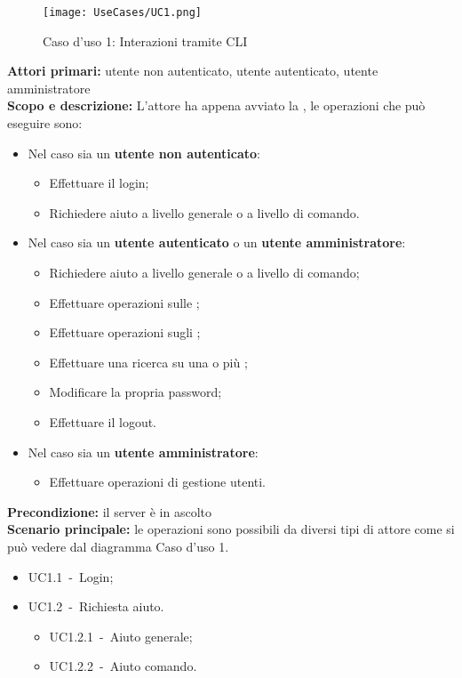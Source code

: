 \documentclass{scalatekids-article}
\begin{document}
\begin{figure}[H]
  \begin{center}
    \texttt{[image: UseCases/UC1.png]}
    \caption{Caso d'uso 1: Interazioni tramite CLI}
  \end{center}
\end{figure}
\textbf{Attori primari:} utente non autenticato, utente autenticato, utente amministratore\\
\textbf{Scopo e descrizione:} L'attore ha appena avviato la , le operazioni che può eseguire sono:
\begin{itemize}
\item Nel caso sia un \textbf{utente non autenticato}:
  \begin{itemize}
  \item Effettuare il login;
  \item Richiedere aiuto a livello generale o a livello di comando.
  \end{itemize}
\item Nel caso sia un \textbf{utente autenticato} o un \textbf{utente amministratore}:
  \begin{itemize}
  \item Richiedere aiuto a livello generale o a livello di comando;
  \item Effettuare operazioni sulle ;
  \item Effettuare operazioni sugli ;
  \item Effettuare una ricerca su una o più ;
  \item Modificare la propria password;
  \item Effettuare il logout.
  \end{itemize}
\item Nel caso sia un \textbf{utente amministratore}:
  \begin{itemize}
  \item Effettuare operazioni di gestione utenti.
  \end{itemize}
\end{itemize}
\textbf{Precondizione:} il server è in ascolto\\
\textbf{Scenario principale:} le operazioni sono possibili da diversi tipi di attore come si può vedere dal diagramma Caso d'uso 1.
\begin{itemize}
\item UC1.1\ -\ Login;
\item UC1.2\ -\ Richiesta aiuto.
  \begin{itemize}
  \item UC1.2.1\ -\ Aiuto generale;
  \item UC1.2.2\ -\ Aiuto comando.
  \end{itemize}
\end{itemize}
\end{document}
